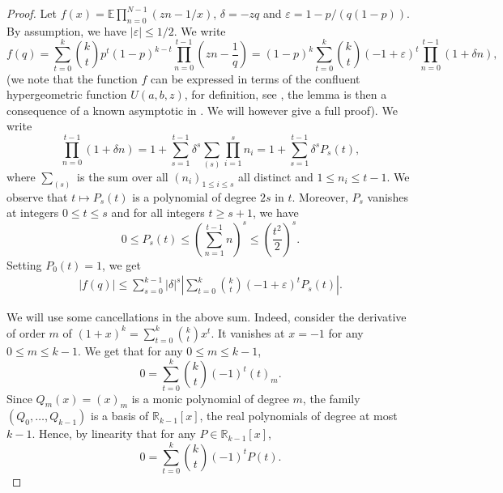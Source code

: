 \documentclass[11pt]{article}
\newcommand{\dE}{\mathbb {E}}
\newcommand{\dR}{\mathbb {R}}
\newcommand{\ABS}[1]{{{\left| #1 \right|}}} %
\newcommand{\PAR}[1]{{{\left(#1\right)}}} %
\newcommand{\1}{1\!\!{\sf I}}\newcommand{\IND}{\1}
\newcommand{\veps}{\varepsilon}
\begin{document}
\begin{proof}
Let $f(x) =  \dE \prod_{n=0}^{N-1} \PAR{ z n -  1/x  }$,  $\delta  = - z q $ and $\veps = 1 -  p/ (q ( 1 - p))$.  By assumption, we have  $| \veps | \leq 1/2$. We write
$$
f(q) = \sum_{t = 0} ^k {k \choose t} p^{t} ( 1- p)^{k-t}  \prod_{n=0}^{t-1} \PAR{z n -  \frac 1 q  }  = \PAR{ 1 - p}^k   \sum_{t = 0} ^k {k \choose t} ( -1 + \veps)^{t}  \prod_{n=0}^{t-1} \PAR{ 1 + \delta n},
$$
(we note that the function $f$ can be expressed in terms of the confluent hypergeometric function $U(a,b,z)$, for definition, see  \cite[(13.2.7)]{DLMF},  the lemma is then a consequence of a known asymptotic in \cite[Chapter 13]{DLMF}. We will however give a full  proof).   We write
$$
  \prod_{n=0}^{t-1} \PAR{ 1 + \delta n} = 1 + \sum_{s=1}^{t-1} \delta^s \sum_{(s)}  \prod_{i=1}^s n_i  = 1 +  \sum_{s=1}^{t-1} \delta^s P_s(t),
$$
where $\sum_{(s)}$ is the sum over all $(n_i)_{1\leq i \leq s}$ all distinct and $1 \leq n_i \leq t-1$. We observe that $t \mapsto P_s(t)$ is a polynomial of degree $2s$ in $t$. Moreover, $P_s$ vanishes at integers $0 \leq t \leq s$ and for all integers $t \geq s+1$, we have 
\begin{equation*}\label{eq:bdPst}
0 \leq P_s (t) \leq \PAR{ \sum_{n=1}^{ t-1} n }^s \leq \PAR{ \frac {t^{2}}{  2}  }^ s.
\end{equation*}
Setting $P_0 (t) =1$, we get
\begin{eqnarray}\label{eq:fpabs}
|f(q)| \leq   \sum_{s=0}^{k-1}   |\delta|^s  \ABS{ \sum_{t=0} ^k  {k \choose t} \PAR{ -  1 + \veps}^{t}  P_s(t)}.
\end{eqnarray}

We will use some cancellations in the above sum. Indeed, consider the derivative of order $m$ of
$ ( 1+ x)^k = \sum_{t=0}^{k} {k \choose t} x^t$.  It vanishes at $x = -1$ for any $0 \leq m \leq k-1$. We get that for any $0 \leq m \leq k-1$,
$$
0 =  \sum_{t=0}^{k} {k \choose t} (-1)^t (t)_m.
$$
Since $Q_m ( x )  = (x)_m$ is a monic polynomial of degree $m$, the family $(Q_0, \ldots , Q_{k-1})$ is a basis of $\dR_{k-1}[x]$, the real polynomials of degree  at most $k-1$. Hence, by linearity that for any  $P \in \dR_{k-1} [x]$, 
\begin{equation}\label{eq:PPPP}
0 =  \sum_{t=0}^{k} {k \choose t} (-1)^t P(t).
\end{equation}



\end{proof}
\end{document}
